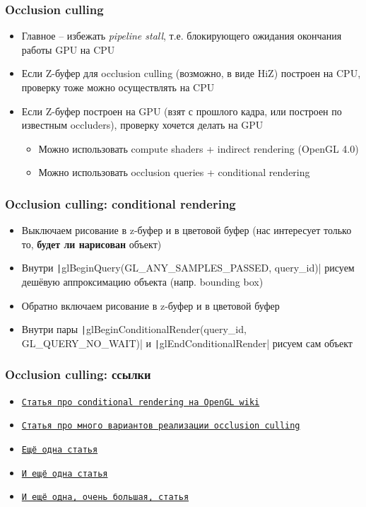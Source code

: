 \documentclass{beamer}
\begin{document}
\begin{frame}[fragile]
\frametitle{Occlusion culling}
\begin{itemize}
\item Главное -- избежать \textit{pipeline stall}, т.е. блокирующего ожидания окончания работы GPU на CPU
\pause
\item Если Z-буфер для occlusion culling (возможно, в виде HiZ) построен на CPU, проверку тоже можно осуществлять на CPU
\pause
\item Если Z-буфер построен на GPU (взят с прошлого кадра, или построен по известным occluders), проверку хочется делать на GPU
\pause
\begin{itemize}
\item Можно использовать compute shaders + indirect rendering (OpenGL 4.0)
\pause
\item Можно использовать occlusion queries + conditional rendering
\end{itemize}
\end{itemize}
\end{frame}

\begin{frame}[fragile]
\frametitle{Occlusion culling: conditional rendering}
\begin{itemize}
\item Выключаем рисование в z-буфер и в цветовой буфер (нас интересует только то, \textbf{будет ли нарисован} объект)
\pause
\item Внутри \texttt|glBeginQuery(GL_ANY_SAMPLES_PASSED, query_id)| рисуем дешёвую аппроксимацию объекта (напр. bounding box)
\pause
\item Обратно включаем рисование в z-буфер и в цветовой буфер
\pause
\item Внутри пары \texttt|glBeginConditionalRender(query_id, GL_QUERY_NO_WAIT)| и \texttt|glEndConditionalRender| рисуем сам объект
\end{itemize}
\end{frame}

\begin{frame}[fragile]
\frametitle{Occlusion culling: ссылки}
\begin{itemize}
\item \href{https://www.khronos.org/opengl/wiki/Vertex_Rendering#Conditional_rendering}{\texttt{Статья про conditional rendering на OpenGL wiki}}
\item \href{https://arm-software.github.io/opengl-es-sdk-for-android/occlusion_culling.html}{\texttt{Статья про много вариантов реализации occlusion culling}}
\item \href{https://developer.nvidia.com/gpugems/gpugems2/part-i-geometric-complexity/chapter-6-hardware-occlusion-queries-made-useful}{\texttt{Ещё одна статья}}
\item \href{https://interplayoflight.wordpress.com/2017/11/15/experiments-in-gpu-based-occlusion-culling}{\texttt{И ещё одна статья}}
\item \href{http://www.diva-portal.org/smash/get/diva2:934562/FULLTEXT02.pdf}{\texttt{И ещё одна, очень большая, статья}}
\end{itemize}
\end{frame}
\end{document}
